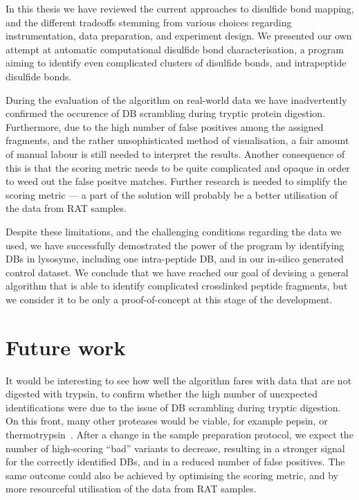 
In this thesis we have reviewed the current approaches to disulfide bond mapping, and the different tradeoffs stemming from various choices regarding instrumentation, data preparation, and experiment design. We presented our own attempt at automatic computational disulfide bond characterisation, a program aiming to identify even complicated clusters of disulfide bonds, and intrapeptide disulfide bonds.

During the evaluation of the algorithm on real-world data we have inadvertently confirmed the occurence of DB scrambling during tryptic protein digestion. Furthermore, due to the high number of false positives among the assigned fragments, and the rather unsophisticated method of visualisation, a fair amount of manual labour is still needed to interpret the results. Another consequence of this is that the scoring metric needs to be quite complicated and opaque in order to weed out the false positve matches. Further research is needed to simplify the scoring metric --- a part of the solution will probably be a better utilisation of the data from RAT samples.

Despite these limitations, and the challenging conditions regarding the data we used, we have successfully demostrated the power of the program by identifying DBs in lysosyme, including one intra-peptide DB, and in our in-silico generated control dataset. We conclude that we have reached our goal of devising a general algorithm that is able to identify complicated crosslinked peptide fragments, but we consider it to be only a proof-of-concept at this stage of the development.

\section*{Future work}

It would be interesting to see how well the algorithm fares with data that are not digested with trypsin, to confirm whether the high number of unexpected identifications were due to the issue of DB scrambling during tryptic digestion. On this front, many other proteases would be viable, for example pepsin, or thermotrypsin~\cite{sung2016evaluation}. After a change in the sample preparation protocol, we expect the number of high-scoring ``bad'' variants to decrease, resulting in a stronger signal for the correctly identified DBs, and in a reduced number of false positives. The same outcome could also be achieved by optimising the scoring metric, and by more resourceful utilisation of the data from RAT samples.

